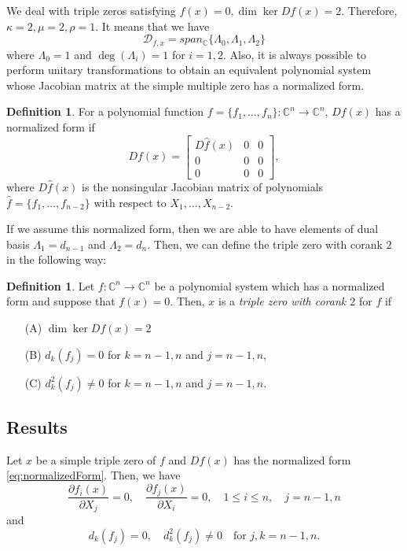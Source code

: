 \documentclass[12pt,oneside,reqno]{amsart}
\theoremstyle{definition}
\newtheorem{defi}[thm]{Definition}
\begin{document}
We deal with triple zeros satisfying $f(x)=0, \dim \ker Df(x)=2$. Therefore, $\kappa=2, \mu=2, \rho =1$.
It means that we have 
\[\mathcal{D}_{f,x}=span_\mathbb{C}\{\Lambda_0,\Lambda_1,\Lambda_2\}\]
where $\Lambda_0=1$ and $\deg(\Lambda_i)=1$ for $i=1,2$. Also, it is always possible to perform unitary transformations to obtain an equivalent polynomial system whose Jacobian matrix at the simple multiple zero has a normalized form.
\begin{defi}
	For a polynomial function $f=\{f_1,\dots, f_n\}:\mathbb{C}^n\rightarrow\mathbb{C}^n$, $Df(x)$ has a normalized form if 
	\[Df(x)=\begin{bmatrix}
	D\hat{f}(x) & 0 & 0\\
	0 & 0 & 0 \\
	0 & 0 & 0
	\end{bmatrix},\label{eq:normalizedForm}\]
	where $D\hat{f}(x)$ is the nonsingular Jacobian matrix of polynomials $\hat{f}=\{f_1,\dots, f_{n-2}\}$ with respect to $X_1,\dots, X_{n-2}$.
\end{defi}


If we assume this normalized form, then we are able to have elements of dual basis $\Lambda_1=d_{n-1}$ and $\Lambda_2=d_n$. Then, we can define the triple zero with corank $2$ in the following way:
\begin{defi}
 Let $f:\mathbb{C}^n\rightarrow\mathbb{C}^n$ be a polynomial system which has a normalized form and suppose that $f(x)=0$. Then, $x$ is a {\it triple zero with corank $2$} for $f$ if
 \begin{itemize}
 	\item[(A)] $\dim\ker Df(x)=2$
 	\item[(B)] $d_k(f_j)=0$ for $k=n-1,n$ and $j=n-1,n$,
 	\item[(C)] $d_k^2(f_j)\ne0$ for $k=n-1,n$ and $j=n-1,n$.
 	\end{itemize}
	
\end{defi}


\subsection{Results}
Let $x$ be a simple triple zero of $f$ and $Df(x)$ has the normalized form \ref{eq:normalizedForm}. Then, we have 
\[\frac{\partial f_i(x)}{\partial X_j}=0,\quad \frac{\partial f_j(x)}{\partial X_i}=0, \quad 1\leq i\leq n,\quad j=n-1,n\]
and
\[d_k(f_j)=0,\quad d_k^2(f_j)\ne 0\quad \text{for }j,k=n-1,n.\]
\end{document}
